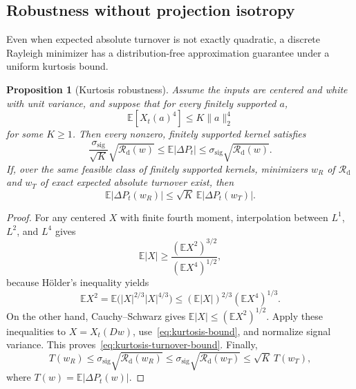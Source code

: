 \documentclass[11pt]{amsart}
\newtheorem{proposition}[theorem]{Proposition}
\theoremstyle{definition}
\theoremstyle{remark}
\newcommand{\Rcal}{\mathcal R}
\begin{document}
\subsection{Robustness without projection isotropy}
Even when expected absolute turnover is not exactly quadratic, a discrete
Rayleigh minimizer has a distribution-free approximation guarantee under a
uniform kurtosis bound.

\begin{proposition}[Kurtosis robustness]\label{prop:kurtosis}
Assume the inputs are centered and white with unit variance, and suppose that
for every finitely supported $a$,
\begin{equation}\label{eq:kurtosis-bound}
 \mathbb E[X_t(a)^4]\leq K\|a\|_2^4
\end{equation}
for some $K\geq1$. Then every nonzero, finitely supported kernel satisfies
\begin{equation}\label{eq:kurtosis-turnover-bound}
 \frac{\sigma_{\mathrm{sig}}}{\sqrt K}
 \sqrt{\Rcal_{\mathrm d}(w)}
 \leq\mathbb E|\Delta P_t|
 \leq\sigma_{\mathrm{sig}}\sqrt{\Rcal_{\mathrm d}(w)}.
\end{equation}
If, over the same feasible class of finitely supported kernels, minimizers
$w_R$ of $\Rcal_{\mathrm d}$ and $w_T$ of exact expected absolute turnover
exist, then
\begin{equation}\label{eq:kurtosis-approximation}
 \mathbb E|\Delta P_t(w_R)|
 \leq\sqrt K\,\mathbb E|\Delta P_t(w_T)|.
\end{equation}
\end{proposition}
\begin{proof}
For any centered $X$ with finite fourth moment, interpolation between
$L^1$, $L^2$, and $L^4$ gives
\[
 \mathbb E|X|
 \geq\frac{(\mathbb E X^2)^{3/2}}{(\mathbb E X^4)^{1/2}},
\]
because H\"older's inequality yields
\[
 \mathbb E X^2
 =\mathbb E\bigl(|X|^{2/3}|X|^{4/3}\bigr)
 \leq(\mathbb E|X|)^{2/3}(\mathbb E X^4)^{1/3}.
\]
On the other hand, Cauchy--Schwarz gives
$\mathbb E|X|\leq(\mathbb E X^2)^{1/2}$. Apply these inequalities to
$X=X_t(Dw)$, use~\eqref{eq:kurtosis-bound}, and normalize signal variance.
This proves~\eqref{eq:kurtosis-turnover-bound}. Finally,
\[
 T(w_R)\leq\sigma_{\mathrm{sig}}\sqrt{\Rcal_{\mathrm d}(w_R)}
 \leq\sigma_{\mathrm{sig}}\sqrt{\Rcal_{\mathrm d}(w_T)}
 \leq\sqrt K\,T(w_T),
\]
where $T(w)=\mathbb E|\Delta P_t(w)|$.
\end{proof}
\end{document}
